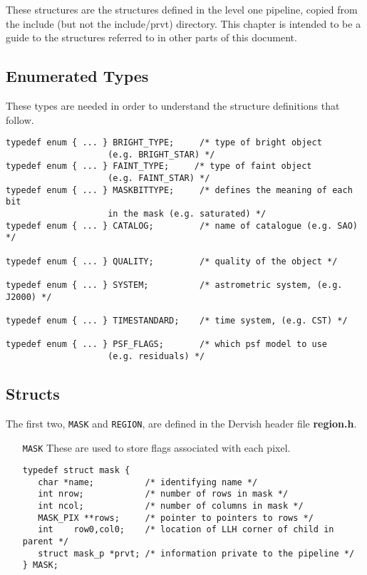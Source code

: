 
%
{\hfuzz=85pt			%

These structures are the structures defined in the level one pipeline,
copied from the include (but not the include/prvt) directory.
This chapter is intended to be a guide to the structures referred to 
in other parts of this document.

\subsection{Enumerated Types}

These types are needed in order to understand the structure definitions
that follow.

\begin{verbatim}
typedef enum { ... } BRIGHT_TYPE;     /* type of bright object 
					(e.g. BRIGHT_STAR) */
typedef enum { ... } FAINT_TYPE;     /* type of faint object 
					(e.g. FAINT_STAR) */
typedef enum { ... } MASKBITTYPE;     /* defines the meaning of each bit
					in the mask (e.g. saturated) */
typedef enum { ... } CATALOG;         /* name of catalogue (e.g. SAO) */

typedef enum { ... } QUALITY;         /* quality of the object */

typedef enum { ... } SYSTEM;          /* astrometric system, (e.g. J2000) */

typedef enum { ... } TIMESTANDARD;    /* time system, (e.g. CST) */

typedef enum { ... } PSF_FLAGS;       /* which psf model to use 
					(e.g. residuals) */
\end{verbatim}

\subsection{Structs}

The first two, {\tt MASK} and {\tt REGION}, are defined in the Dervish
header file {\bf region.h}.

\begin{itemize}
\item[{\tt MASK}]
These are used to store flags associated with each pixel.

\begin{verbatim}
typedef struct mask {
   char *name;          /* identifying name */
   int nrow;            /* number of rows in mask */
   int ncol;            /* number of columns in mask */
   MASK_PIX **rows;     /* pointer to pointers to rows */
   int    row0,col0;    /* location of LLH corner of child in parent */
   struct mask_p *prvt; /* information private to the pipeline */
} MASK;
\end{verbatim}


\end{itemize}}
